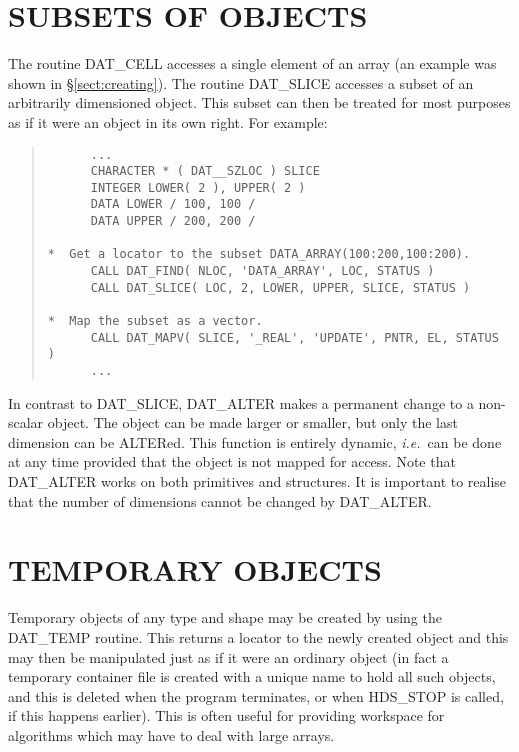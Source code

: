 \documentclass[11pt]{article}
\newcommand{\htmlref}[2]{#1}
\newcommand{\xlabel}[1]{}
\newcommand{\st}[1]{{\em{#1}}}
\begin{document}
\section{\xlabel{accessing_subsets}SUBSETS OF OBJECTS}

The routine \htmlref{DAT\_CELL}{DAT_CELL} accesses a single element of
an array (an example was shown in \S\ref{sect:creating}). The routine
\htmlref{DAT\_SLICE}{DAT_SLICE} accesses a subset of an arbitrarily
dimensioned object. This subset can then be treated for most purposes
as if it were an object in its own right. For example:

\small
\begin{quote}
\begin{verbatim}
      ...
      CHARACTER * ( DAT__SZLOC ) SLICE
      INTEGER LOWER( 2 ), UPPER( 2 )
      DATA LOWER / 100, 100 /
      DATA UPPER / 200, 200 /

*  Get a locator to the subset DATA_ARRAY(100:200,100:200).
      CALL DAT_FIND( NLOC, 'DATA_ARRAY', LOC, STATUS )
      CALL DAT_SLICE( LOC, 2, LOWER, UPPER, SLICE, STATUS )

*  Map the subset as a vector.
      CALL DAT_MAPV( SLICE, '_REAL', 'UPDATE', PNTR, EL, STATUS )
      ...
\end{verbatim}
\end{quote}
\normalsize

In contrast to DAT\_SLICE, \htmlref{DAT\_ALTER}{DAT_ALTER} makes a
permanent change to a non-scalar object. The object can be made larger
or smaller, but only the last dimension can be ALTERed. This function
is entirely dynamic, \st{i.e.}\ can be done at any time provided that
the object is not mapped for access. Note that DAT\_ALTER works on
both primitives and structures. It is important to realise that the
number of dimensions cannot be changed by DAT\_ALTER.

\section{\xlabel{temporary_objects}TEMPORARY OBJECTS}

Temporary objects of any \htmlref{type}{sect:type} and \htmlref{shape}{sect:shape} may be
created by using the \htmlref{DAT\_TEMP}{DAT_TEMP} routine. This
returns a \htmlref{locator}{sect:locators} to the newly created object and this may then be
manipulated just as if it were an ordinary object (in fact a temporary
container file is created with a unique name to hold all such objects,
and this is deleted when the program terminates, or when
\htmlref{HDS\_STOP}{HDS_STOP} is called, if this happens
earlier). This is often useful for providing workspace for algorithms
which may have to deal with large arrays.
\end{document}
